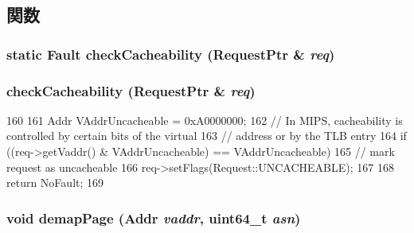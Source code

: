 \subsection{関数}
\hypertarget{classMipsISA_1_1TLB_a745813e9dbe31434a535773f4fd1396e}{
\subsubsection[{checkCacheability}]{\setlength{\rightskip}{0pt plus 5cm}static {\bf Fault} checkCacheability ({\bf RequestPtr} \& {\em req})}}
\label{classMipsISA_1_1TLB_a745813e9dbe31434a535773f4fd1396e}
\hypertarget{classMipsISA_1_1TLB_a40ebca6d00905ad6f0ea93be1621a1bd}{
\subsubsection[{checkCacheability}]{ checkCacheability ({\bf RequestPtr} \& {\em req})}}
\label{classMipsISA_1_1TLB_a40ebca6d00905ad6f0ea93be1621a1bd}



\begin{DoxyCode}
160 {
161     Addr VAddrUncacheable = 0xA0000000;
162     // In MIPS, cacheability is controlled by certain bits of the virtual
163     // address or by the TLB entry
164     if ((req->getVaddr() & VAddrUncacheable) == VAddrUncacheable) {
165         // mark request as uncacheable
166         req->setFlags(Request::UNCACHEABLE);
167     }
168     return NoFault;
169 }
\end{DoxyCode}
\hypertarget{classMipsISA_1_1TLB_a2d698ff909513b48a1263f8a5440e067}{
\subsubsection[{demapPage}]{\setlength{\rightskip}{0pt plus 5cm}void demapPage ({\bf Addr} {\em vaddr}, \/  uint64\_\-t {\em asn})}}
\label{classMipsISA_1_1TLB_a2d698ff909513b48a1263f8a5440e067}



